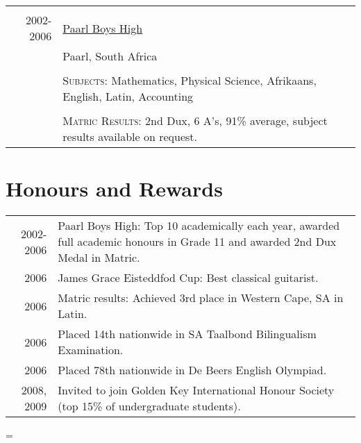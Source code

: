 \documentclass[a4paper,10pt,notitlepage]{article}
\newenvironment{absolutelynopagebreak}
  {\par\nobreak\vfil\penalty0\vfilneg
   \vtop\bgroup}
  {\par\xdef\tpd{\the\prevdepth}\egroup
   \prevdepth=\tpd}
\begin{document}
\begin{absolutelynopagebreak}
\begin{tabular}{r|p{11cm}}
		\multicolumn{2}{c}{}\\
		
		\textsc{2002-2006} & \href{https://en.wikipedia.org/wiki/Paarl_Boys_27_High_School}{Paarl Boys High} \\ & Paarl, South Africa \\ \\
		&\textsc{Subjects}: Mathematics, Physical Science, Afrikaans, English, Latin, Accounting \\ \\
		&\normalsize \textsc{Matric Results}: 2nd Dux, 6 A's, 91\% average, subject results available on request. \\
		
	\end{tabular}

\section{Honours and Rewards}
	\begin{tabular}{r|p{11cm}}
		\textsc{2002-2006}  & Paarl Boys High: Top 10 academically each year, awarded full academic honours in Grade 11 and awarded 2nd Dux Medal in Matric. \\
		\textsc{2006}       & James Grace Eisteddfod Cup: Best classical guitarist.                                                                          \\
		\textsc{2006}       & Matric results: Achieved 3rd place in Western Cape, SA in Latin.                                                                   \\
		\textsc{2006}       & Placed 14th nationwide in SA Taalbond Bilingualism Examination.                                                                \\
		\textsc{2006}       & Placed 78th nationwide in De Beers English Olympiad.                                                                           \\
		\textsc{2008, 2009} & Invited to join Golden Key International Honour Society (top 15\% of undergraduate students).                                  
	\end{tabular}
	
\end{absolutelynopagebreak}


\addtolength{\voffset}{-0.4cm} %
\end{document}
